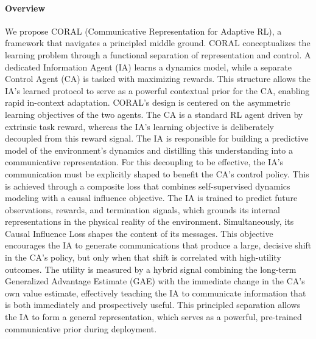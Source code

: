 \documentclass[letterpaper]{article}
\begin{document}
\paragraph{Overview} We propose CORAL (Communicative Representation for Adaptive RL), a framework that navigates a principled middle ground. CORAL conceptualizes the learning problem through a functional separation of representation and control. A dedicated Information Agent (IA) learns a dynamics model, while a separate Control Agent (CA) is tasked with maximizing rewards. This structure allows the IA's learned protocol to serve as a powerful contextual prior for the CA, enabling rapid in-context adaptation.
CORAL's design is centered on the asymmetric learning objectives of the two agents. The CA is a standard RL agent driven by extrinsic task reward, whereas the IA's learning objective is deliberately decoupled from this reward signal. The IA is responsible for building a predictive model of the environment's dynamics and distilling this understanding into a communicative representation. For this decoupling to be effective, the IA's communication must be explicitly shaped to benefit the CA's control policy.
This is achieved through a composite loss that combines self-supervised dynamics modeling with a causal influence objective. The IA is trained to predict future observations, rewards, and termination signals, which grounds its internal representations in the physical reality of the environment. Simultaneously, its Causal Influence Loss shapes the content of its messages. This objective encourages the IA to generate communications that produce a large, decisive shift in the CA's policy, but only when that shift is correlated with high-utility outcomes. The utility is measured by a hybrid signal combining the long-term Generalized Advantage Estimate (GAE) with the immediate change in the CA's own value estimate, effectively teaching the IA to communicate information that is both immediately and prospectively useful. This principled separation allows the IA to form a general representation, which serves as a powerful, pre-trained communicative prior during deployment.
\end{document}
